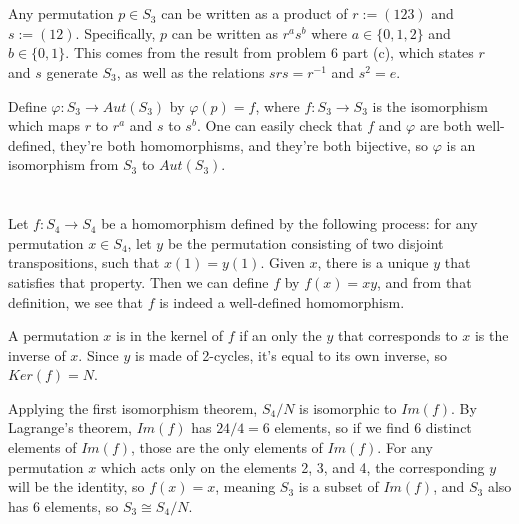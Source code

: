 \documentclass[12pt]{article}
\begin{document}
\section{}
\noindent{}\bigskip

Any permutation $p \in S_3$ can be written as a product of $r:=(123)$ and $s:=(12)$. Specifically, $p$ can be written as $r^as^b$ where $a \in \{0,1,2\}$ and $b \in \{0,1\}$. This comes from the result from problem 6 part (c), which states $r$ and $s$ generate $S_3$, as well as the relations $srs=r^{-1}$ and $s^2=e$.
\par
Define $\varphi: S_3 \rightarrow Aut(S_3)$ by $\varphi(p) = f$, where $f: S_3 \rightarrow S_3$ is the isomorphism which maps $r$ to $r^a$ and $s$ to $s^b$. One can easily check that $f$ and $\varphi$ are both well-defined, they're both homomorphisms, and they're both bijective, so $\varphi$ is an isomorphism from $S_3$ to $Aut(S_3)$.

\section{}
\noindent{}\bigskip

Let $f: S_4 \rightarrow S_4$ be a homomorphism defined by the following process: for any permutation $x \in S_4$, let $y$ be the permutation consisting of two disjoint transpositions, such that $x(1)=y(1)$. Given $x$, there is a unique $y$ that satisfies that property. Then we can define $f$ by $f(x)=xy$, and from that definition, we see that $f$ is indeed a well-defined homomorphism.
\par
A permutation $x$ is in the kernel of $f$ if an only the $y$ that corresponds to $x$ is the inverse of $x$. Since $y$ is made of 2-cycles, it's equal to its own inverse, so $Ker(f)=N$.
\par
Applying the first isomorphism theorem, $S_4/N$ is isomorphic to $Im(f)$. By Lagrange's theorem, $Im(f)$ has $24/4=6$ elements, so if we find 6 distinct elements of $Im(f)$, those are the only elements of $Im(f)$. For any permutation $x$ which acts only on the elements 2, 3, and 4, the corresponding $y$ will be the identity, so $f(x)=x$, meaning $S_3$ is a subset of $Im(f)$, and $S_3$ also has 6 elements, so $S_3 \cong S_4/N$.
\par
\end{document}
